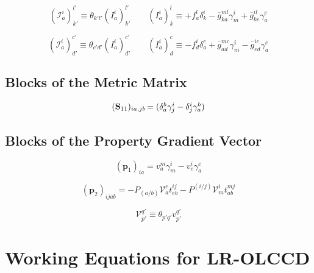 \begin{subappendices}
\begin{equation}
    (\mathcal{I}_a^i)_{k'}^{l'}
    \equiv
    \theta_{k'l'}
    (I_a^i)_{k'}^{l'}
    \qquad
    (I_a^i)_k^l
    \equiv
    +
    f_a^l
    \delta_k^i
    -
    \overline{g}_{ka}^{ml}
    \gamma_m^i
    +
    \overline{g}_{ke}^{il}
    \gamma_a^e
\end{equation}

\begin{equation}
    (\mathcal{I}_a^i)_{d'}^{c'}
    \equiv
    \theta_{c'd'}
    (I_a^i)_{d'}^{c'}
    \qquad
    (I_a^i)_d^c
    \equiv
    -
    f_d^i
    \delta_a^c
    +
    \overline{g}_{ad}^{mc}
    \gamma_m^i
    -
    \overline{g}_{ed}^{ic}
    \gamma_a^e
\end{equation}

\subsection{Blocks of the Metric Matrix}

\begin{equation}
    \label{eq:s11-odc12}
    \begin{array}{r@{\,}l}
        (\mathbf{S}_{11})_{ia,jb}
        &=
        (
            \delta^b_a
            \gamma^i_j
            -
            \delta^i_j
            \gamma^b_a
        )
    \end{array}
\end{equation}

\subsection{Blocks of the Property Gradient Vector}

\begin{equation}
    \label{eq:p1-odc12}
    (\mathbf{p}_1)_{ia}
    =
    v_a^m
    \gamma_m^i
    -
    v_e^i
    \gamma_a^e
\end{equation}

\begin{equation}
    (\mathbf{p}_2)_{ijab}
    =
    -
    P_{(a/b)}
    \mathcal{V}_a^e
    t_{eb}^{ij}
    -
    P^{(i/j)}
    \mathcal{V}_m^i
    t_{ab}^{mj}
\end{equation}

\begin{equation}
    \mathcal{V}_{p'}^{q'}
    \equiv
    \theta_{p'q'}
    v_{p'}^{q'}
\end{equation}

\section{Working Equations for LR-OLCCD}


\end{subappendices}
